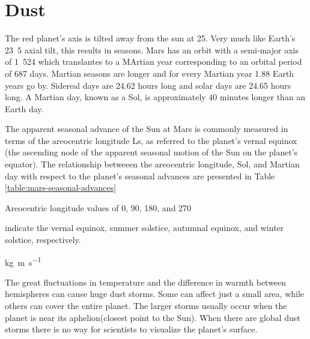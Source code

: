 %



\section{Dust}
\label{sec:MartianEnvironment:Dust}
%


The red planet's axis is tilted away from the sun at \si{25}{\degree}. Very much like Earth's \si{23.5}{\degree} axial tilt, this results in seasons. Mars has an orbit with a semi-major axis of \si{1.524}{\astronomicalunit} which translantes to a MArtian year corresponding to an orbital period of 687 days. Martian seasons are longer and for every Martian year 1.88 Earth years go by. Sidereal days are 24.62 hours long and solar days are 24.65 hours long. A Martian day, known as a Sol, is approximately 40 minutes longer than an Earth day.

The apparent seasonal advance of the Sun at Mars is commonly measured in terms of the areocentric longitude Ls, as referred to the planet's vernal equinox (the ascending node of the apparent seasonal motion of the Sun on the planet's equator). The relationship betweeen the areocentric longitude, Sol, and Martian day with respect to the planet's seasonal advances are presented in Table \ref{table:mars-seasonal-advances}



Areocentric longitude values of \si{0}{\degree}, \si{90}{\degree}, \si{180}{\degree}, and \si{270}{\degree}


 indicate the vernal equinox, summer solstice, autumnal equinox, and winter solstice, respectively.


\si{kg.m.s^{-1}}

 The great fluctuations in temperature and the difference in warmth between hemispheres can cause huge dust storms. Some can affect just a small area, while others can cover the entire planet. The larger storms usually occur when the planet is near its aphelion(closest point to the Sun). When there are global dust storms there is no way for scientists to visualize the planet’s surface.

